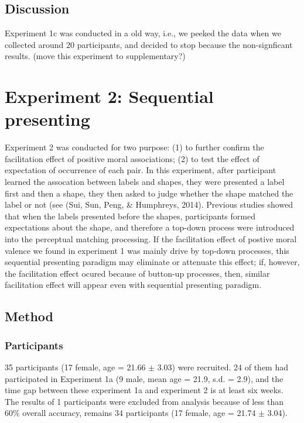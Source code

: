 \documentclass[man]{apa6}
\begin{document}
\hypertarget{discussion-1}{%
\subsection{Discussion}\label{discussion-1}}

Experiment 1c was conducted in a old way, i.e., we peeked the data when we collected around 20 participants, and decided to stop because the non-signficant results. (move this experiment to supplementary?)

\hypertarget{experiment-2-sequential-presenting}{%
\section{Experiment 2: Sequential presenting}\label{experiment-2-sequential-presenting}}

Experiment 2 was conducted for two purpose: (1) to further confirm the facilitation effect of positive moral associations; (2) to test the effect of expectation of occurrence of each pair. In this experiment, after participant learned the assocation between labels and shapes, they were presented a label first and then a shape, they then asked to judge whether the shape matched the label or not (see (Sui, Sun, Peng, \& Humphreys, 2014). Previous studies showed that when the labels presented before the shapes, participants formed expectations about the shape, and therefore a top-down process were introduced into the perceptual matching processing. If the facilitation effect of postive moral valence we found in experiment 1 was mainly drive by top-down processes, this sequential presenting paradigm may eliminate or attenuate this effect; if, however, the facilitation effect ocured because of button-up processes, then, similar facilitation effect will appear even with sequential presenting paradigm.

\hypertarget{method-2}{%
\subsection{Method}\label{method-2}}

\hypertarget{participants-3}{%
\subsubsection{Participants}\label{participants-3}}

35 participants (17 female, age = 21.66 \(\pm\) 3.03) were recruited. 24 of them had participated in Experiment 1a (9 male, mean age = 21.9, s.d. = 2.9), and the time gap between these experiment 1a and experiment 2 is at least six weeks. The results of 1 participants were excluded from analysis because of less than 60\% overall accuracy, remains 34 participants (17 female, age = 21.74 \(\pm\) 3.04).
\end{document}
